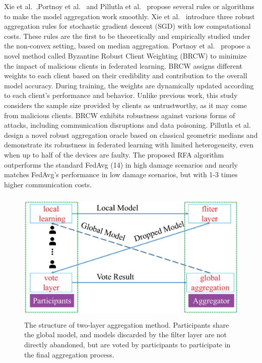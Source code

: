 \documentclass[a4paper,fleqn]{cas-dc}
\begin{document}
Xie et al.~\cite{xie2018generalized},Portnoy et al.~\cite{portnoy2020towards} and Pillutla et
al.~\cite{pillutla2022robust} propose several rules or algorithms to make
the model aggregation work smoothly. Xie et al.~\cite{xie2018generalized}
introduce three robust aggregation rules for stochastic
gradient descent (SGD) with low computational costs.
These rules are the first to be theoretically and empirically
studied under the non-convex setting, based on median
aggregation. Portnoy et al.~\cite{portnoy2020towards} propose a novel method
called Byzantine Robust Client Weighting (BRCW) to
minimize the impact of malicious clients in federated
learning. BRCW assigns different weights to each client
based on their credibility and contribution to the overall
model accuracy. During training, the weights are
dynamically updated according to each client's performance
and behavior. Unlike previous work, this study considers
the sample size provided by clients as untrustworthy,
as it may come from malicious clients. BRCW exhibits
robustness against various forms of attacks, including
communication disruptions and data poisoning. Pillutla
et al.~\cite{pillutla2022robust} design a novel robust aggregation oracle based
on classical geometric medians and demonstrate its
robustness in federated learning with limited heterogeneity, even
when up to half of the devices are faulty. The proposed
RFA algorithm outperforms the standard FedAvg (14)
in high damage scenarios and nearly matches FedAvg's
performance in low damage scenarios, but with 1-3 times
higher communication costs.

\begin{figure}[h]
	\centering
	\includegraphics[width=1.0\linewidth,height=2.5in]{output/fig19.eps}
	\caption{The structure of two-layer aggregation method. Participants
		share the global model, and models discarded by the filter layer are
		not directly abandoned, but are voted by participants to participate
		in the final aggregation process.}
	\label{fig19}
\end{figure}
\end{document}
